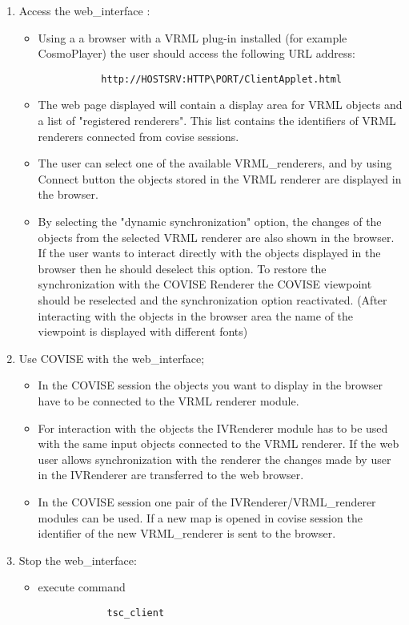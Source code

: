 \begin{enumerate}
  \item Access the web\_interface :
        \begin{itemize}
	\item Using a a browser with a VRML plug-in installed (for example CosmoPlayer) the user should access the following URL address:
        \begin{verbatim}  
	       http://HOSTSRV:HTTP\PORT/ClientApplet.html
	\end{verbatim} 
        \item The web page displayed will contain a display area for VRML objects
          and a list of "registered renderers". This list contains the
          identifiers of VRML renderers connected from covise sessions.
        \item The user can select one of the available VRML\_renderers, and by using
          Connect button the objects stored in the VRML renderer are displayed
          in the browser.
        \item By selecting the "dynamic synchronization" option, the changes of the
          objects from the selected VRML renderer are also shown in the browser.
          If the user wants to interact directly with the objects
          displayed in the browser then he should deselect this option.
          To restore the synchronization with the COVISE Renderer the COVISE
          viewpoint should be reselected and the synchronization option
          reactivated. (After interacting with the objects in the
          browser area the name of the viewpoint is displayed with different fonts)
        \end{itemize}
 
 \item Use COVISE with the web\_interface;
         \begin{itemize}     
         \item In the COVISE session the objects you want to display in the browser
         have to be connected to the VRML renderer module.
         \item For interaction with the objects the IVRenderer module has to
         be used with the same input objects connected to the VRML renderer.
         If the web user allows synchronization with the renderer
         the changes made by user in the IVRenderer are transferred to the
         web browser.
         \item In the COVISE session one pair of the IVRenderer/VRML\_renderer modules can
         be used. If a new map is opened in covise session
         the identifier of the new VRML\_renderer is sent to the browser.
         \end{itemize}
	 
  \item Stop the web\_interface:
         \begin{itemize}
         \item execute command 
	 \begin{verbatim}
	        tsc_client
	 \end{verbatim}
	 \end{itemize}
\end{enumerate}





